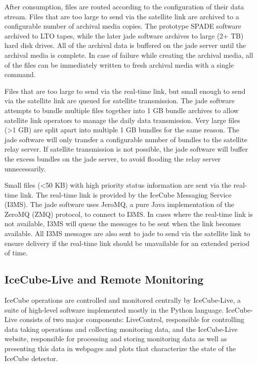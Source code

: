 After consumption, files are routed according to the configuration of their data stream. Files that are too large to send via the satellite link are archived to
a configurable number of archival media copies. The prototype SPADE software archived to LTO tapes, while the later jade software archives to large (2+ TB) hard
disk drives. All of the archival data is buffered on the jade server until the archival media is complete. In case of failure while creating the archival media, 
all of the files can be immediately written to fresh archival media with a single command.

Files that are too large to send via the real-time link, but small enough to send via the satellite link are queued for satellite transmission. The jade software
attempts to bundle multiple files together into 1 GB bundle archives to allow satellite link operators to manage the daily data transmission. Very large files
(>1 GB) are split apart into multiple 1 GB bundles for the same reason. The jade software will only transfer a configurable number of bundles to the satellite
relay server. If satellite transmission is not possible, the jade software will buffer the excess bundles on the jade server, to avoid flooding the relay server
unnecessarily.


Small files (<50 KB) with high priority status information are sent via the real-time link. The real-time link is provided by the IceCube Messaging Service
(I3MS). The jade software uses JeroMQ, a pure Java implementation of the ZeroMQ (ZMQ) protocol, to connect to I3MS. In cases where the real-time link is not
available, I3MS will queue the messages to be sent when the link becomes available. All I3MS messages are also sent to jade to send via the satellite link to
ensure delivery if the real-time link should be unavailable for an extended period of time.

\subsection{IceCube-Live and Remote Monitoring}

IceCube operations are controlled and monitored centrally by IceCube-Live, a suite of high-level software implemented mostly in the Python language.
IceCube-Live consists of two major components: LiveControl, responsible for controlling data taking operations and
collecting monitoring data, and the IceCube-Live website, responsible for processing and storing monitoring data as well as presenting this data
in webpages and plots that characterize the state of the IceCube detector.

